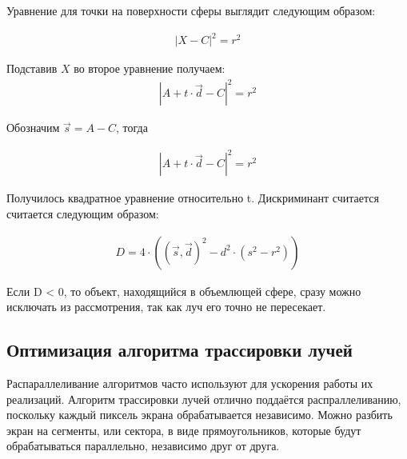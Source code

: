 Уравнение для точки на поверхности сферы выглядит следующим образом:

\begin{equation} \label{eq:fdff}
	\begin{aligned}
		|X - C|^2 = r^2
	\end{aligned}
\end{equation}

Подставив $X$ во второе уравнение получаем:
\begin{equation} \label{eq:a}
	\begin{aligned}
		|A + t\cdot \vec{d} - C|^2 = r^2
	\end{aligned}
\end{equation}


Обозначим $\vec{s} = A - C$, тогда

\begin{equation} \label{eq:ab}
	\begin{aligned}
		|A + t\cdot \vec{d} - C|^2 = r^2
	\end{aligned}
\end{equation}

Получилось квадратное уравнение относительно t. Дискриминант считается считается следующим образом:

\begin{equation} \label{eq:ab}
	\begin{aligned}
		D = 4\cdot ((\vec{s}, \vec{d})^2 - d^2\cdot (s^2 - r^2))  
	\end{aligned}
\end{equation}


Если D < 0, то объект, находящийся в объемлющей сфере, сразу можно исключать из рассмотрения, так как луч его точно не пересекает.

\subsection{Оптимизация алгоритма трассировки лучей}

Распараллеливание алгоритмов часто используют для ускорения работы их реализаций. Алгоритм трассировки лучей отлично поддаётся распраллеливанию, поскольку каждый пиксель экрана обрабатывается независимо. Можно разбить экран на сегменты, или сектора, в виде прямоугольников, которые будут обрабатываться параллельно, независимо друг от друга. 

